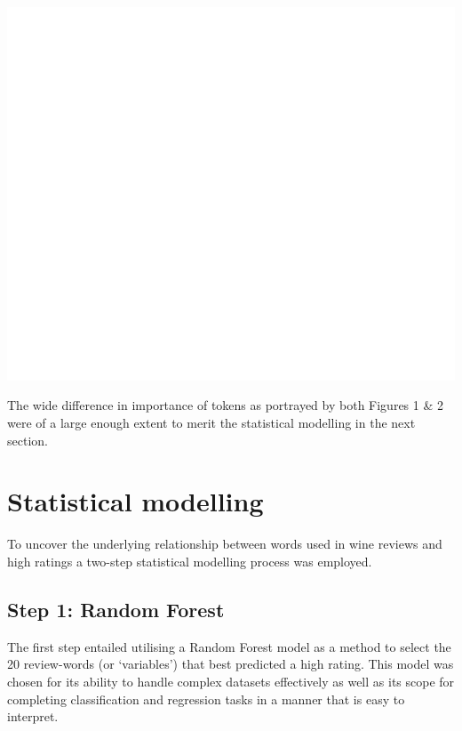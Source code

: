 \documentclass[11pt,preprint]{elsarticle}
\let\origfigure\figure
\let\endorigfigure\endfigure
\renewenvironment{figure}[1][2] {
    \expandafter\origfigure\expandafter[H]
} {
    \endorigfigure
}
\numberwithin{equation}{section}
\numberwithin{figure}{section}
\numberwithin{table}{section}
\begin{document}
\begin{figure}[H]

{\centering \includegraphics[width=0.8\linewidth]{writeup/fig2} 

}

\caption{Word cloud of popular words in reviews based on popularity index}\label{fig:fig2}
\end{figure}

The wide difference in importance of tokens as portrayed by both Figures
1 \& 2 were of a large enough extent to merit the statistical modelling
in the next section.

\newpage

\section{Statistical modelling}\label{statistical-modelling}

\label{StatMod} To uncover the underlying relationship between words
used in wine reviews and high ratings a two-step statistical modelling
process was employed.

\subsection{Step 1: Random Forest}\label{step-1-random-forest}

The first step entailed utilising a Random Forest model as a method to
select the 20 review-words (or `variables') that best predicted a high
rating. This model was chosen for its ability to handle complex datasets
effectively as well as its scope for completing classification and
regression tasks in a manner that is easy to interpret.
\end{document}
